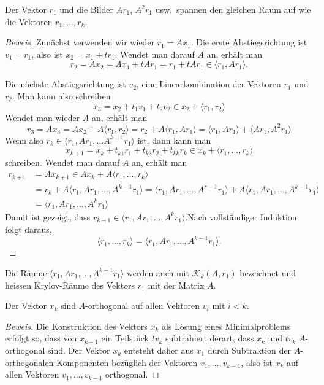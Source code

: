 \documentclass[a4paper,11pt]{article}
\begin{document}
%
%
\begin{beobachtung}
Der Vektor $r_1$ und die Bilder $Ar_1$, $A^2r_1$ usw.~spannen den gleichen
Raum auf wie die Vektoren $r_1,\dots,r_k$.
\end{beobachtung}

\begin{proof}[Beweis]
Zunächst verwenden wir wieder $r_1=Ax_1$.
Die erste Abstiegsrichtung ist $v_1=r_1$, also ist $x_2=x_1+tr_1$.
Wendet man darauf $A$ an, erhält man
\[
r_2=Ax_2 = Ax_1 + tAr_1 = r_1 + tAr_1 \in \langle r_1,Ar_1\rangle.
\]

Die nächste Abstiegsrichtung ist $v_2$, eine Linearkombination der Vektoren
$r_1$ und $r_2$.
Man kann also schreiben
\[
x_3 = x_2 + t_1v_1 + t_2v_2 \in x_2 + \langle r_1,r_2\rangle
\]
Wendet man wieder $A$ an, erhält man
\[
r_3 = Ax_3
=
Ax_2 + A\langle r_1,r_2\rangle
=
r_2 + A\langle r_1,Ar_1\rangle
=
\langle r_1,Ar_1\rangle + \langle Ar_1,A^2r_1\rangle
\]
Wenn also $r_k\in \langle r_1,Ar_1,\dots A^{k-1}r_1\rangle$ ist, dann
kann man
\[
x_{k+1} = x_{k} + t_{k1}r_1 + t_{k2}r_2 + t_{kk}r_k
\in
x_{k} + \langle r_1,\dots,r_{k}\rangle
\]
schreiben.
Wendet man darauf $A$ an, erhält man
\begin{align*}
r_{k+1}
&=
Ax_{k+1}
\in
Ax_{k} + A\langle r_1,\dots,r_k\rangle
\\
&=
r_k
+
A\langle r_1,Ar_1,\dots,A^{k-1}r_1\rangle
=
\langle r_1,Ar_1,\dots,A^{r-1}r_1\rangle
+
A\langle r_1,Ar_1,\dots,A^{k-1}r_1\rangle
\\
&=
\langle r_1,Ar_1,\dots,A^kr_1\rangle
\end{align*}
Damit ist gezeigt, dass $r_{k+1} \in \langle r_1,Ar_1,\dots,A^kr_1\rangle$.Nach vollständiger Induktion folgt daraus, 
\[
\langle r_1,\dots,r_k\rangle = \langle r_1,Ar_1,\dots,A^{k-1}r_1\rangle.
\]
\end{proof}

\begin{definition}
Die Räume $\langle r_1,Ar_1,\dots,A^{k-1}r_1\rangle$ werden auch
mit $\mathcal{K}_k(A,r_1)$ bezeichnet und heissen Krylov-Räume des
Vektors $r_1$ mit der Matrix $A$.
\end{definition}

%
%
\begin{beobachtung}
Der Vektor $x_k$ sind $A$-orthogonal auf allen Vektoren $v_i$ mit
$i < k$.
\end{beobachtung}

\begin{proof}[Beweis]
Die Konstruktion des Vektors $x_k$ als Lösung eines Minimalproblems
erfolgt so, dass von $x_{k-1}$
ein Teilstück $tv_k$ subtrahiert derart, dass $x_{k}$ und $tv_k$ 
$A$-orthogonal sind.
Der Vektor $x_k$ entsteht daher aus $x_1$ durch Subtraktion
der $A$-orthogonalen Komponenten bezüglich der Vektoren
$v_1,\dots,v_{k-1}$, also ist $x_k$ auf allen Vektoren $v_1,\dots,v_{k-1}$
orthogonal.
\end{proof}
\end{document}
